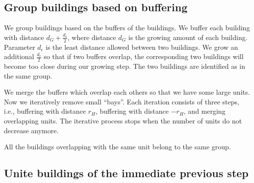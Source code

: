 \documentclass[graybox]{svmult}
\begin{document}
\subsection{Group buildings based on buffering}
\label{sec:Grouping}
We group buildings based on the buffers of the buildings. 
We buffer each building with distance $d_G + \frac{d_\epsilon}{2}$, 
where distance $d_G$ is the growing amount of each building. 
Parameter $d_\epsilon$ is the least distance allowed between two buildings.
We grow an additional $\frac{d_\epsilon}{2}$ so that if two buffers overlap, 
the corresponding two buildings will become too close during our growing step.
The two buildings are identified as in the same group.

We merge the buffers which overlap each others so that we have some large units.
Now we iteratively remove small ``bays''.
Each iteration consists of three steps, i.e., 
buffering with distance $r_H$, buffering with distance $-r_H$, and
merging overlapping units.
The iterative process stops when the number of units do not decrease anymore.

All the buildings overlapping with the same unit belong to the same group.






%




\subsection{Unite buildings of the immediate previous step}
\label{sec:Unite}
\end{document}
